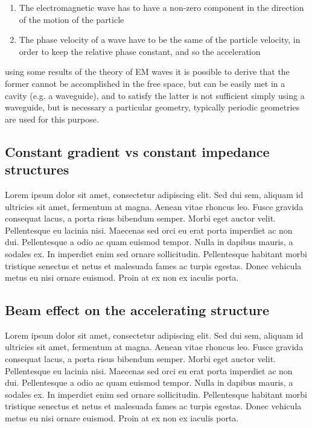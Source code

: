 \begin{enumerate}
\item The electromagnetic wave has to have a non-zero component in the direction of the motion of the particle
\item The phase velocity of a wave have to be the same of the particle velocity, in order to keep the relative phase constant, and so the acceleration
\end{enumerate}
using some results of the theory of EM waves it is possible to derive that the former cannot be accomplished in the free space, but can be easily met in a cavity (e.g. a waveguide), and to satisfy the latter is not sufficient simply using a waveguide, but is necessary a particular geometry, typically periodic geometries are used for this purpose.







\cite{Botta:EM}




\subsection[Constant gradient vs constant impedance structures]{Constant gradient vs constant impedance structures}
Lorem ipsum dolor sit amet, consectetur adipiscing elit. Sed dui sem, aliquam id ultricies sit amet, fermentum at magna. Aenean vitae rhoncus leo. Fusce gravida consequat lacus, a porta risus bibendum semper. Morbi eget auctor velit. Pellentesque eu lacinia nisi. Maecenas sed orci eu erat porta imperdiet ac non dui. Pellentesque a odio ac quam euismod tempor. Nulla in dapibus mauris, a sodales ex. In imperdiet enim sed ornare sollicitudin. Pellentesque habitant morbi tristique senectus et netus et malesuada fames ac turpis egestas. Donec vehicula metus eu nisi ornare euismod. Proin at ex non ex iaculis porta.

\subsection[Beam effect on the accelerating structure]{Beam effect on the accelerating structure}
Lorem ipsum dolor sit amet, consectetur adipiscing elit. Sed dui sem, aliquam id ultricies sit amet, fermentum at magna. Aenean vitae rhoncus leo. Fusce gravida consequat lacus, a porta risus bibendum semper. Morbi eget auctor velit. Pellentesque eu lacinia nisi. Maecenas sed orci eu erat porta imperdiet ac non dui. Pellentesque a odio ac quam euismod tempor. Nulla in dapibus mauris, a sodales ex. In imperdiet enim sed ornare sollicitudin. Pellentesque habitant morbi tristique senectus et netus et malesuada fames ac turpis egestas. Donec vehicula metus eu nisi ornare euismod. Proin at ex non ex iaculis porta.


